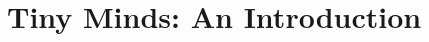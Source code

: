 \documentclass[../main]{subfiles}
\begin{document}
\chapter{Tiny Minds: An Introduction} \label{chp:}
\end{document}
